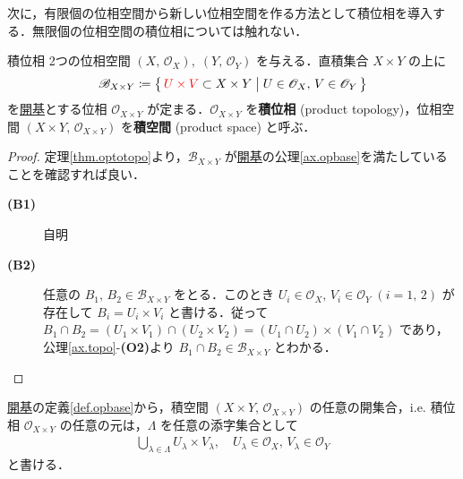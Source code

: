 \documentclass[geometry_main]{subfiles}
\begin{document}
次に，有限個の位相空間から新しい位相空間を作る方法として積位相を導入する．無限個の位相空間の積位相については触れない．

\begin{mydef}[label=def.prodtopo]{積位相}
	2つの位相空間 $(X,\, \mathscr{O}_X),\; (Y,\, \mathscr{O}_Y)$ を与える．直積集合 $X \times Y$ の上に
	\begin{align}
		\mathscr{B}_{X\times Y} \coloneqq \bigl\{\, \textcolor{red}{U\times V} \subset X\times Y \bigm| U\in \mathscr{O}_X,\, V \in \mathscr{O}_Y \,\bigr\}
	\end{align} 
	を\hyperref[def.opbase]{開基}とする位相 $\mathscr{O}_{X \times Y}$ が定まる．$\mathscr{O}_{X \times Y}$ を\textbf{積位相} (product topology)，位相空間 $(X\times Y,\, \mathscr{O}_{X\times Y})$ を\textbf{積空間} (product space) と呼ぶ．
\end{mydef}

\begin{proof}
	定理\ref{thm.optotopo}より，$\mathscr{B}_{X\times Y}$ が\hyperref[def.opbase]{開基}の公理\ref{ax.opbase}を満たしていることを確認すれば良い．
	\begin{description}
		\item[\textbf{(B1)}] 自明
		\item[\textbf{(B2)}] 任意の $B_1,\, B_2 \in \mathscr{B}_{X\times Y}$ をとる．このとき $U_i \in \mathscr{O}_X,\, V_i \in \mathscr{O}_Y \; (i=1,\, 2)$ が存在して $B_i = U_i \times V_i$ と書ける．従って $B_1 \cap B_2 = (U_1 \times V_1) \cap (U_2 \times V_2) = (U_1 \cap U_2) \times (V_1 \cap V_2)$ であり，公理\ref{ax.topo}-\textbf{(O2)}より $B_1 \cap B_2 \in \mathscr{B}_{X\times Y}$ とわかる．
	\end{description}
\end{proof}

\hyperref[def.opbase]{開基}の定義\ref{def.opbase}から，積空間 $(X\times Y,\, \mathscr{O}_{X\times Y})$ の任意の開集合，i.e. 積位相 $\mathscr{O}_{X\times Y}$ の任意の元は，$\Lambda$ を任意の添字集合として
\begin{align}
	\bigcup_{\lambda \in \Lambda} U_{\lambda} \times V_{\lambda},\quad U_\lambda \in \mathscr{O}_X,\, V_\lambda \in \mathscr{O}_Y
\end{align}
と書ける．
\end{document}
